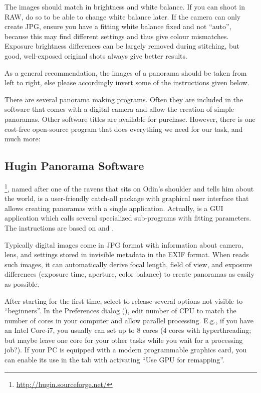 The images should match in brightness and white balance. If you can
shoot in RAW, do so to be able to change white balance later. If the
camera can only create JPG, ensure you have a fitting white balance
fixed and not ``auto'', because this may find different settings and
thus give colour mismatches. Exposure brightness differences can be
largely removed during stitching, but good, well-exposed original
shots always give better results.

As a general recommendation, the images of a panorama should be taken
from left to right, else please accordingly invert some of the
instructions given below.

There are several panorama making programs. Often they are included in
the software that comes with a digital camera and allow the creation
of simple panoramas. Other software titles are available for
purchase. However, there is one cost-free open-source program
that does everything we need for our task, and much more:


\subsection{Hugin Panorama Software}
\label{sec:landscapes:Hugin}

\footnote{\url{http://hugin.sourceforge.net/}}, named
after one of the ravens that sits on Odin's shoulder and tells him
about the world, is a user-friendly catch-all package with graphical
user interface that allows creating panoramas with a single
application. Actually,  is a GUI application which
calls several specialized sub-programs with fitting parameters.  The
instructions are based on  and
.

Typically digital images come in JPG format with information about
camera, lens, and settings stored in invisible metadata in the EXIF
format. When  reads such images, it can automatically derive
focal length, field of view, and exposure differences (exposure time,
aperture, color balance) to create panoramas as easily as
possible. 

After starting  for the first time, select  to release several
options not visible to ``beginners''.  In the Preferences dialog
(), edit number of CPU to match the number of
cores in your computer and allow parallel processing. E.g., if you
have an Intel Core-i7, you usually can set up to 8 cores (4 cores with
hyperthreading; but maybe leave one core for your other tasks while
you wait for a processing job?).  If your PC is equipped with a
modern programmable graphics card, you can enable its use in the  tab
with activating ``Use GPU for remapping''.

